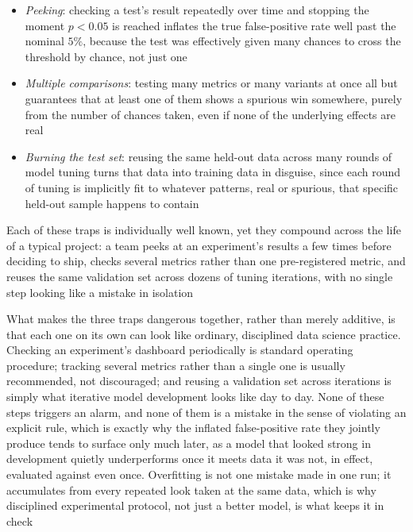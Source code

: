 \begin{itemize}
  \item \emph{Peeking}: checking a test's result repeatedly over time and stopping
    the moment $p < 0.05$ is reached inflates the true false-positive rate well past
    the nominal $5\%$, because the test was effectively given many chances to
    cross the threshold by chance, not just one

  \item \emph{Multiple comparisons}: testing many metrics or many variants at once
    all but guarantees that at least one of them shows a spurious win somewhere,
    purely from the number of chances taken, even if none of the underlying effects
    are real

  \item \emph{Burning the test set}: reusing the same held-out data across many rounds
    of model tuning turns that data into training data in disguise, since each
    round of tuning is implicitly fit to whatever patterns, real or spurious,
    that specific held-out sample happens to contain
\end{itemize}

Each of these traps is individually well known, yet they compound across the
life of a typical project: a team peeks at an experiment's results a few times before
deciding to ship, checks several metrics rather than one pre-registered metric, and
reuses the same validation set across dozens of tuning iterations, with no
single step looking like a mistake in isolation

What makes the three traps dangerous together, rather than merely additive, is that
each one on its own can look like ordinary, disciplined data science practice. Checking
an experiment's dashboard periodically is standard operating procedure; tracking
several metrics rather than a single one is usually recommended, not discouraged;
and reusing a validation set across iterations is simply what iterative model
development looks like day to day. None of these steps triggers an alarm, and
none of them is a mistake in the sense of violating an explicit rule, which is exactly
why the inflated false-positive rate they jointly produce tends to surface only much
later, as a model that looked strong in development quietly underperforms once
it meets data it was not, in effect, evaluated against even once. Overfitting is
not one mistake made in one run; it accumulates from every repeated look taken
at the same data, which is why disciplined experimental protocol, not just a
better model, is what keeps it in check


